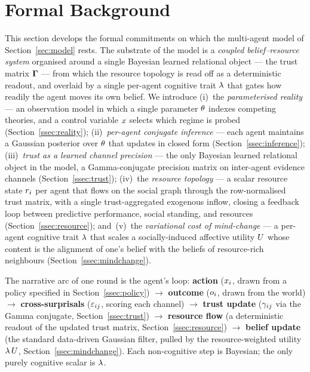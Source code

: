 \section{Formal Background}
\label{sec:formal}

This section develops the formal commitments on which the multi-agent
model of Section~\ref{sec:model} rests. The substrate of the model is a
\emph{coupled belief--resource system} organised around a single
Bayesian learned relational object --- the trust matrix $\boldsymbol{\Gamma}$ ---
from which the resource topology is read off as a deterministic
readout, and overlaid by a single per-agent cognitive trait $\lambda$
that gates how readily the agent moves its own belief. We introduce
(i)~the \emph{parameterised reality} --- an observation model in which
a single parameter $\theta$ indexes competing theories, and a
control variable $x$ selects which regime is probed
(Section~\ref{ssec:reality});
(ii)~\emph{per-agent conjugate inference} --- each agent maintains a
Gaussian posterior over $\theta$ that updates in closed form
(Section~\ref{ssec:inference});
(iii)~\emph{trust as a learned channel precision} --- the only
Bayesian learned relational object in the model, a Gamma-conjugate
precision matrix on inter-agent evidence channels
(Section~\ref{ssec:trust});
(iv)~the \emph{resource topology} --- a scalar resource state
$r_{i}$ per agent that flows on the social graph through the
row-normalised trust matrix, with a single trust-aggregated exogenous
inflow, closing a feedback loop between predictive performance, social
standing, and resources (Section~\ref{ssec:resource});
and~(v)~the \emph{variational cost of mind-change} --- a per-agent
cognitive trait $\lambda$ that scales a socially-induced affective
utility $U$ whose content is the alignment of one's belief with
the beliefs of resource-rich neighbours
(Section~\ref{ssec:mindchange}).

The narrative arc of one round is the agent's loop: \textbf{action}
($x_i$, drawn from a policy specified in Section~\ref{ssec:policy})
$\to$ \textbf{outcome} ($o_i$, drawn from the world) $\to$
\textbf{cross-surprisals} ($\varepsilon_{ij}$, scoring each channel)
$\to$ \textbf{trust update} ($\gamma_{ij}$ via the Gamma conjugate,
Section~\ref{ssec:trust}) $\to$ \textbf{resource flow} (a deterministic
readout of the updated trust matrix, Section~\ref{ssec:resource}) $\to$
\textbf{belief update} (the standard data-driven Gaussian filter,
pulled by the resource-weighted utility $\lambda\,U$,
Section~\ref{ssec:mindchange}). Each non-cognitive step is Bayesian;
the only purely cognitive scalar is $\lambda$.

